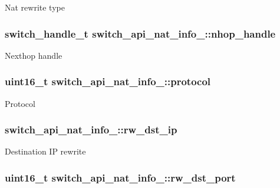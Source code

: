 Nat rewrite type \hypertarget{structswitch__api__nat__info___ad16480b6b6f2261c492a57d05638dd7d}{
\subsubsection[{nhop\+\_\+handle}]{\setlength{\rightskip}{0pt plus 5cm}switch\+\_\+handle\+\_\+t switch\+\_\+api\+\_\+nat\+\_\+info\+\_\+\+::nhop\+\_\+handle}}\label{structswitch__api__nat__info___ad16480b6b6f2261c492a57d05638dd7d}
Nexthop handle \hypertarget{structswitch__api__nat__info___a68ec768bbaf46c6abfffd53372e9b63a}{
\subsubsection[{protocol}]{\setlength{\rightskip}{0pt plus 5cm}uint16\+\_\+t switch\+\_\+api\+\_\+nat\+\_\+info\+\_\+\+::protocol}}\label{structswitch__api__nat__info___a68ec768bbaf46c6abfffd53372e9b63a}
Protocol \hypertarget{structswitch__api__nat__info___a16c2c4d919e561874739f6ec7715bd9e}{
\subsubsection[{rw\+\_\+dst\+\_\+ip}]{ switch\+\_\+api\+\_\+nat\+\_\+info\+\_\+\+::rw\+\_\+dst\+\_\+ip}}\label{structswitch__api__nat__info___a16c2c4d919e561874739f6ec7715bd9e}
Destination I\+P rewrite \hypertarget{structswitch__api__nat__info___a98ab0cc5dcb9a9de0d3fef9be6037956}{
\subsubsection[{rw\+\_\+dst\+\_\+port}]{\setlength{\rightskip}{0pt plus 5cm}uint16\+\_\+t switch\+\_\+api\+\_\+nat\+\_\+info\+\_\+\+::rw\+\_\+dst\+\_\+port}}\label{structswitch__api__nat__info___a98ab0cc5dcb9a9de0d3fef9be6037956}
